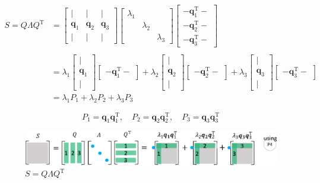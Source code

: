 \documentclass[letterpaper]{article}
\DeclareRobustCommand\transp{^{\mathrm{T}}}
\begin{document}
\begin{align*}
  S = Q \Lambda Q\transp
&= \begin{bmatrix}
    | & | & |\\
    \bm{q}_1 & \bm{q}_2 & \bm{q}_3\\
    | & | & |
  \end{bmatrix}
  \begin{bmatrix}
    \lambda_1 \\
           & \lambda_2 & \\
           & & \lambda_3
  \end{bmatrix}
  \begin{bmatrix}
  - \bm{q}_1\transp -\\
  - \bm{q}_2\transp -\\
  - \bm{q}_3\transp -
  \end{bmatrix}\\
  \\
  &=
  \lambda_1 \begin{bmatrix}
    |\\
    \bm{q}_1\\
    |
  \end{bmatrix}
  \begin{bmatrix}
    - \bm{q}_1\transp - 
  \end{bmatrix}
  +
  \lambda_2 \begin{bmatrix}
  |\\
  \bm{q}_2\\
  |
  \end{bmatrix}
  \begin{bmatrix}
  - \bm{q}_2\transp -
  \end{bmatrix} 
  +
  \lambda_3 \begin{bmatrix}
    |\\
    \bm{q}_3 \\
    |
  \end{bmatrix}
  \begin{bmatrix}
    - \bm{q}_3\transp -
  \end{bmatrix} \\
&= \lambda_1 P_1 + \lambda_2 P_2 + \lambda_3 P_3
\end{align*}

\begin{equation*}
  P_1=\bm{q}_1 \bm{q}_1\transp, \quad P_2=\bm{q}_2 \bm{q}_2\transp, \quad P_3=\bm{q}_3 \bm{q}_3\transp
\end{equation*}


\begin{figure}[H]
  \centering
  \includegraphics[scale=0.8]{EVD.eps}
  \caption{$S=Q \Lambda Q\transp$}
\end{figure}
\end{document}
